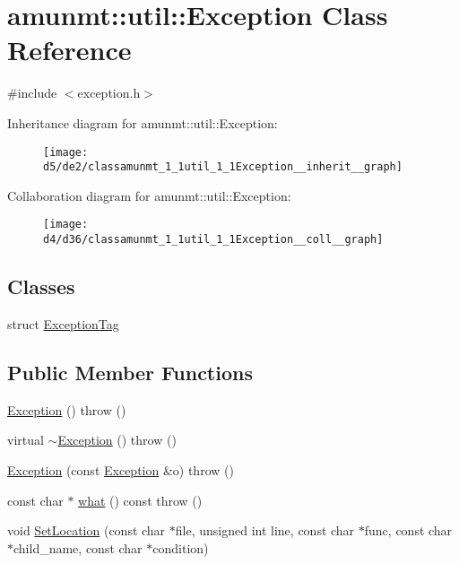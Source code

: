 \hypertarget{classamunmt_1_1util_1_1Exception}{}\section{amunmt\+:\+:util\+:\+:Exception Class Reference}
\label{classamunmt_1_1util_1_1Exception}


{\ttfamily \#include $<$exception.\+h$>$}



Inheritance diagram for amunmt\+:\+:util\+:\+:Exception\+:
\nopagebreak
\begin{figure}[H]
\begin{center}
\leavevmode
\texttt{[image: d5/de2/classamunmt\_1\_1util\_1\_1Exception\_\_inherit\_\_graph]}
\end{center}
\end{figure}


Collaboration diagram for amunmt\+:\+:util\+:\+:Exception\+:
\nopagebreak
\begin{figure}[H]
\begin{center}
\leavevmode
\texttt{[image: d4/d36/classamunmt\_1\_1util\_1\_1Exception\_\_coll\_\_graph]}
\end{center}
\end{figure}
\subsection*{Classes}
\begin{DoxyCompactItemize}
\item 
struct \hyperlink{classamunmt_1_1util_1_1Exception_dd/dc0/structamunmt_1_1util_1_1Exception_1_1ExceptionTag}{Exception\+Tag}
\end{DoxyCompactItemize}
\subsection*{Public Member Functions}
\begin{DoxyCompactItemize}
\item 
\hyperlink{classamunmt_1_1util_1_1Exception_a526817179fb1de47fe88eac1f0d7666d}{Exception} ()  throw ()
\item 
virtual \hyperlink{classamunmt_1_1util_1_1Exception_af11727c8605197438815701138d1b94d}{$\sim$\+Exception} ()  throw ()
\item 
\hyperlink{classamunmt_1_1util_1_1Exception_ae4e85570de9ea645867468d4cbbbee18}{Exception} (const \hyperlink{classamunmt_1_1util_1_1Exception}{Exception} \&o)  throw ()
\item 
const char $\ast$ \hyperlink{classamunmt_1_1util_1_1Exception_aebd0e9aca70ad9db18a9c024242fe0de}{what} () const   throw ()
\item 
void \hyperlink{classamunmt_1_1util_1_1Exception_a09d9f9239f89076d5f72e5b2be946896}{Set\+Location} (const char $\ast$file, unsigned int line, const char $\ast$func, const char $\ast$child\+\_\+name, const char $\ast$condition)
\end{DoxyCompactItemize}
